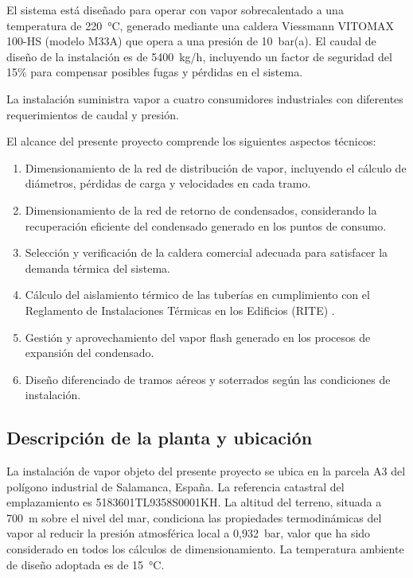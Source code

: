 \documentclass[12pt]{article}
\begin{document}
El sistema está diseñado para operar con vapor sobrecalentado a una temperatura de 220~°C, generado mediante una caldera Viessmann VITOMAX 100-HS (modelo M33A) que opera a una presión de 10~bar(a). El caudal de diseño de la instalación es de 5400~kg/h, incluyendo un factor de seguridad del 15\% para compensar posibles fugas y pérdidas en el sistema.

La instalación suministra vapor a cuatro consumidores industriales con diferentes requerimientos de caudal y presión.

El alcance del presente proyecto comprende los siguientes aspectos técnicos:

\begin{enumerate}[label=\arabic*., leftmargin=2em]
	\item Dimensionamiento de la red de distribución de vapor, incluyendo el cálculo de diámetros, pérdidas de carga y velocidades en cada tramo.
	\item Dimensionamiento de la red de retorno de condensados, considerando la recuperación eficiente del condensado generado en los puntos de consumo.
	\item Selección y verificación de la caldera comercial adecuada para satisfacer la demanda térmica del sistema.
	\item Cálculo del aislamiento térmico de las tuberías en cumplimiento con el Reglamento de Instalaciones Térmicas en los Edificios (RITE) \cite{RITE2007}.
	\item Gestión y aprovechamiento del vapor flash generado en los procesos de expansión del condensado.
	\item Diseño diferenciado de tramos aéreos y soterrados según las condiciones de instalación.
\end{enumerate}

\subsection{Descripción de la planta y ubicación}
\label{subsec:descripcion-planta-ubicacion}

La instalación de vapor objeto del presente proyecto se ubica en la parcela A3 del polígono industrial de Salamanca, España. La referencia catastral del emplazamiento es 5183601TL9358S0001KH. La altitud del terreno, situada a 700~m sobre el nivel del mar, condiciona las propiedades termodinámicas del vapor al reducir la presión atmosférica local a 0,932~bar, valor que ha sido considerado en todos los cálculos de dimensionamiento. La temperatura ambiente de diseño adoptada es de 15~°C.
\end{document}

